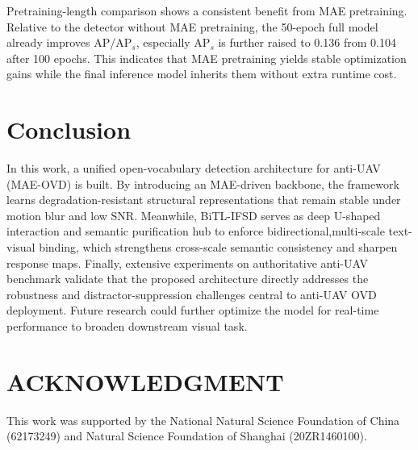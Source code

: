 \documentclass[letterpaper, 10 pt, conference]{ieeeconf}  %
\begin{document}
Pretraining-length comparison shows a consistent benefit from MAE pretraining. Relative to the detector without MAE pretraining, the 50-epoch full model already improves AP/AP$_s$, especially AP$_s$ is further raised to 0.136 from 0.104 after 100 epochs. This indicates that MAE pretraining yields stable optimization gains while the final inference model inherits them without extra runtime cost.

\section{Conclusion}
\label{sec:conclusion}

In this work, a unified open-vocabulary detection architecture for anti-UAV (MAE-OVD) is built. By introducing an MAE-driven backbone, the framework learns degradation-resistant structural representations that remain stable under motion blur and low SNR. Meanwhile, BiTL-IFSD serves as deep U-shaped interaction and semantic purification hub to enforce bidirectional,multi-scale text-visual binding, which strengthens cross-scale semantic consistency and sharpen response maps. Finally, extensive experiments on authoritative anti-UAV benchmark validate that the proposed architecture directly addresses the robustness and distractor-suppression challenges central to anti-UAV OVD deployment. Future research could further optimize the model for real-time performance to broaden downstream visual task.

\section*{ACKNOWLEDGMENT}
This work was supported by the National Natural Science Foundation of China (62173249) and Natural Science Foundation of Shanghai (20ZR1460100).

\begingroup
\footnotesize


\endgroup
\end{document}
